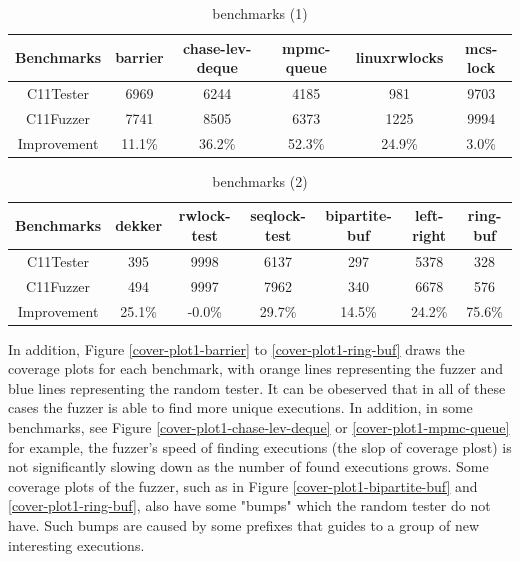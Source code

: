 \begin{table}[h!]
	\begin{tabular}{ |c|ccccc| }
		\hline
		Benchmarks  & barrier & chase-lev-deque & mpmc-queue & linuxrwlocks & mcs-lock \\
		\hline
		C11Tester   & 6969    & 6244            & 4185       & 981          & 9703     \\
		C11Fuzzer   & 7741    & 8505            & 6373       & 1225         & 9994     \\
		\hline
		Improvement & 11.1\%  & 36.2\%          & 52.3\%     & 24.9\%       & 3.0\%    \\
		\hline
	\end{tabular}
	\caption{benchmarks (1)}
	\label{c11fuzzer-bench1}

\end{table}

\begin{table}[h!]
	\begin{tabular}{ |c|cccccc| }
		\hline
		Benchmarks  & dekker & rwlock-test & seqlock-test & bipartite-buf & left-right & ring-buf \\
		\hline
		C11Tester   & 395    & 9998        & 6137         & 297           & 5378       & 328      \\
		C11Fuzzer   & 494    & 9997        & 7962         & 340           & 6678       & 576      \\
		\hline
		Improvement & 25.1\% & -0.0\%      & 29.7\%       & 14.5\%        & 24.2\%     & 75.6\%   \\
		\hline
	\end{tabular}
	\caption{benchmarks (2)}
	\label{c11fuzzer-bench2}
\end{table}


In addition, Figure \ref{cover-plot1-barrier} to \ref{cover-plot1-ring-buf} draws the coverage plots for each benchmark, with orange lines representing the fuzzer and blue lines representing the random tester. It can be obeserved that in all of these cases the fuzzer is able to find more unique executions. In addition, in some benchmarks, see Figure \ref{cover-plot1-chase-lev-deque} or \ref{cover-plot1-mpmc-queue} for example, the fuzzer's speed of finding executions (the slop of coverage plost) is not significantly slowing down as the number of found executions grows. Some coverage plots of the fuzzer, such as in Figure \ref{cover-plot1-bipartite-buf} and \ref{cover-plot1-ring-buf}, also have some "bumps" which the random tester do not have. Such bumps are caused by some prefixes that guides to a group of new interesting executions.


